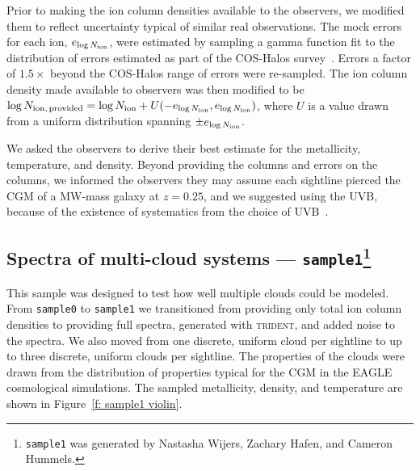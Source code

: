 \documentclass[fleqn,usenatbib]{mnras}
\begin{document}
Prior to making the ion column densities available to the observers, we modified them to reflect uncertainty typical of similar real observations.
The mock errors for each ion, $e_{\log N_{\rm ion}}$, were estimated by sampling a gamma function fit to the distribution of errors estimated as part of the COS-Halos survey~\citep{werk2013COSHALOS}.
Errors a factor of $1.5\times$ beyond the COS-Halos range of errors were re-sampled.
The ion column density made available to observers was then modified to be $\log N_{\rm ion,\,provided} = \log N_{\rm ion} + U(-e_{\log N_{\rm ion}}, e_{\log N_{\rm ion}} )$, where $U$ is a value drawn from a uniform distribution spanning $\pm e_{\log N_{\rm ion}}$.

We asked the observers to derive their best estimate for the metallicity, temperature, and density.
Beyond providing the columns and errors on the columns, we informed the observers they may assume each sightline pierced the CGM of a MW-mass galaxy at $z=0.25$, and we suggested using the \cite{haardt2012RADIATIVE} UVB, because of the existence of systematics from the choice of UVB~\citep{Wotta2016, Wotta2019, acharya2021How,Gibson2022}.

\subsection[Spectra of multi-cloud systems --- \texttt{sample1}]{Spectra of multi-cloud systems --- \texttt{sample1}\footnote{
\texttt{sample1} was generated by Nastasha Wijers, Zachary Hafen, and Cameron Hummels.
}}
\label{s: data generation -- sample1}

This sample was designed to test how well multiple clouds could be modeled.
From \texttt{sample0} to \texttt{sample1} we transitioned from providing only total ion column densities to providing full spectra, generated with \textsc{trident}, and added noise to the spectra.
We also moved from one discrete, uniform cloud per sightline to up to three discrete, uniform clouds per sightline.
The properties of the clouds were drawn from the distribution of properties typical for the CGM in the \textsc{EAGLE} cosmological simulations.
The sampled metallicity, density, and temperature are shown in Figure~\ref{f: sample1 violin}.
\end{document}
